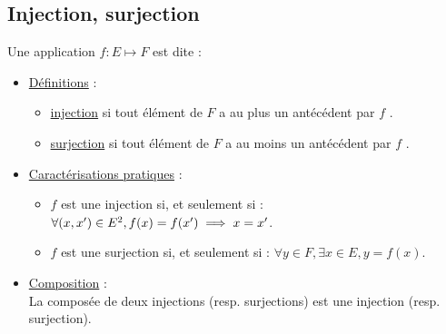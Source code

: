 \subsection{Injection, surjection}
\begin{defprop}
    Une application \(f : E \mapsto F\) est dite :
    \begin{itemize}
        \item \underline{Définitions} :\\
        \begin{itemize}
            \item  \underline{injection} si tout élément de \(F\) a au plus un antécédent par \(f\) .
            \item \underline{surjection} si tout élément de \(F\) a au moins un antécédent par \(f\) .
        \end{itemize} 
        \item \underline{Caractérisations pratiques} : \\
        \begin{itemize}
        \item \(f\) est une injection si, et seulement si :\( \forall(x, x') \in E^2, f (x) = f (x') \implies x = x'\).
        \item \(f\) est une surjection si, et seulement si : \(\forall y \in F, \exists x \in E, y = f (x)\).
        \end{itemize}
        \item \underline{Composition} :\\
            La composée de deux injections (resp. surjections) est une injection (resp. surjection).
    \end{itemize}
\end{defprop}

